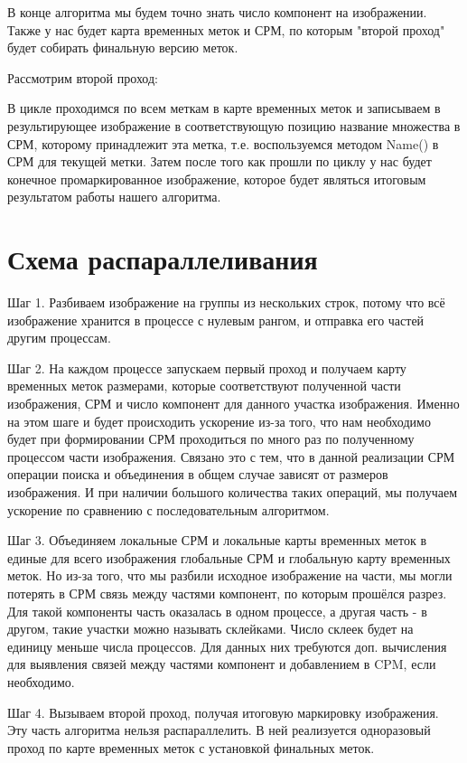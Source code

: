 \documentclass{report}
\begin{document}
 В конце алгоритма мы будем точно знать число компонент на изображении. Также у нас будет карта временных меток и СРМ, по которым "второй проход" будет собирать финальную версию меток.
	
Рассмотрим второй проход:

В цикле проходимся по всем меткам в карте временных меток и записываем в результирующее изображение в соответствующую позицию название множества в СРМ, которому принадлежит эта метка, т.е. воспользуемся методом Name() в СРМ для текущей метки.
Затем после того как прошли по циклу у нас будет конечное промаркированное изображение, которое будет являться итоговым результатом работы нашего алгоритма.
		
	\newpage
\section*{Схема распараллеливания}
\par Шаг 1. Разбиваем изображение на группы из нескольких строк, потому что всё изображение хранится в процессе с нулевым рангом,
и отправка его частей другим процессам.
\par Шаг 2. На каждом процессе запускаем первый проход и получаем карту временных меток размерами, которые соответствуют полученной части изображения, СРМ и число компонент для данного участка изображения. Именно на этом шаге и будет происходить ускорение из-за того, что
нам необходимо будет при формировании СРМ проходиться по много раз по
полученному процессом части изображения. Связано это с тем, что в данной
реализации СРМ операции поиска и объединения в общем случае зависят от
размеров изображения. И при наличии большого количества таких операций,
мы получаем ускорение по сравнению с последовательным алгоритмом.
\par Шаг 3. Объединяем локальные СРМ и локальные карты временных меток в единые для всего изображения глобальные СРМ и глобальную карту временных меток. Но из-за того, что мы разбили исходное изображение на части, мы могли потерять в СРМ связь между частями компонент, по которым прошёлся разрез. Для такой компоненты часть оказалась в одном процессе, а другая часть - в другом, такие участки можно называть склейками. Число склеек будет на единицу меньше числа процессов. Для данных них требуются доп. вычисления для выявления связей между частями компонент и добавлением в CPM, если необходимо.
\par Шаг 4. Вызываем второй проход, получая
итоговую маркировку изображения. Эту часть алгоритма
нельзя распараллелить. В ней реализуется одноразовый проход по карте временных меток с установкой финальных меток.
\newpage
\end{document}
